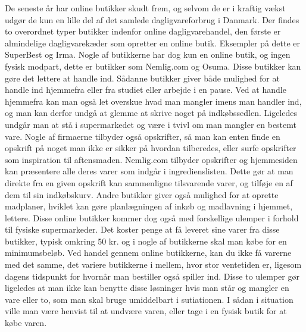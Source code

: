 De seneste år har online butikker skudt frem, og selvom de er i kraftig vækst udgør de kun en lille del af det samlede dagligvareforbrug i Danmark\citep{SOTA_MP1}.
Der findes to overordnet typer butikker indenfor online dagligvarehandel, den første er almindelige dagligvarekæder som opretter en online butik.
Eksempler på dette er SuperBest og Irma\citep{SOTA_MP_SB, SOTA_MP_IRMA}.
Nogle af butikkerne har dog kun en online butik, og ingen fysisk modpart, dette er butikker som Nemlig.com og Osuma\citep{SOTA_MP_NEMLIG, SOTA_MP_OSUMA}.
Disse butikker kan gøre det lettere at handle ind.
Sådanne butikker giver både mulighed for at handle ind hjemmefra eller fra studiet eller arbejde i en pause.
Ved at handle hjemmefra kan man også let overskue hvad man mangler imens man handler ind, og man kan derfor undgå at glemme at skrive noget på indkøbssedlen.
Ligeledes undgår man at stå i supermarkedet og være i tvivl om man mangler en bestemt vare.
Nogle af firmaerne tilbyder også opskrifter, så man kan enten finde en opskrift på noget man ikke er sikker på hvordan tilberedes, eller surfe opskrifter som inspiration til aftensmaden.
Nemlig.com tilbyder opskrifter og hjemmesiden kan præsentere alle deres varer som indgår i ingredienslisten.
Dette gør at man direkte fra en given opskrift kan sammenligne tilsvarende varer, og tilføje en af dem til sin indkøbskurv.
Andre butikker giver også mulighed for at oprette madplaner, hviklet kan gøre planlægningen af inkøb og madlavning i hjemmet, lettere.
Disse online butikker kommer dog også med forskellige ulemper i forhold til fysiske supermarkeder.
Det koster penge at få leveret sine varer fra disse butikker, typisk omkring 50 kr. og i nogle af butikkerne skal man købe for en minimumsbeløb.
Ved handel gennem online butikkerne, kan du ikke få varerne med det samme, det variere butikkerne i mellem, hvor stor ventetiden er, ligesom dagens tidspunkt for hvornår man bestiller også spiller ind.
Disse to ulemper gør ligeledes at man ikke kan benytte disse løsninger hvis man står og mangler en vare eller to, som man skal bruge umiddelbart i sutiationen.
I sådan i situation ville man være henvist til at undvære varen, eller tage i en fysisk butik for at købe varen.


